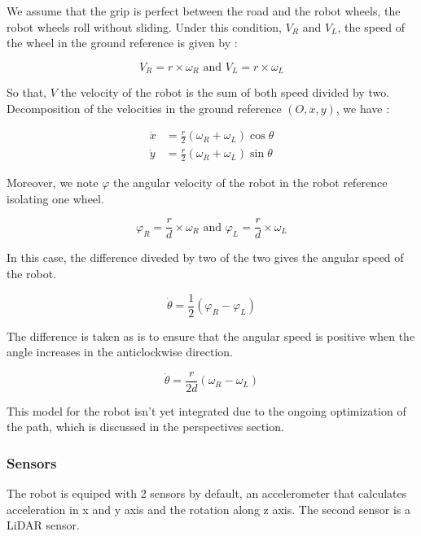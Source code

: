 \documentclass[../main.tex]{subfiles}
\begin{document}
\vspace{0.5em}

We assume that the grip is perfect between the road and the robot wheels, the robot wheels roll without sliding. Under this condition, $V_R$ and $V_L$, the speed of the wheel in the ground reference is given by :

$$\displaystyle V_R = r \times \omega_R \text{     and     } V_L = r \times \omega_L$$

So that, $V$ the velocity of the robot is the sum of both speed divided by two. Decomposition of the velocities in the ground reference $(O, x, y)$, we have :


\begin{align*}
	\displaystyle \dot{x} &= \frac{r}{2} \left(\omega_R + \omega_L\right) \cos \theta\\
	\displaystyle \dot{y} &= \frac{r}{2} \left(\omega_R + \omega_L\right) \sin \theta
\end{align*}


Moreover, we note $\varphi$ the angular velocity of the robot in the robot reference isolating one wheel.


$$\displaystyle \varphi_R = \frac{r}{d} \times \omega_R \text{     and     } \varphi_L =  \frac{r}{d} \times \omega_L$$

In this case, the difference diveded by two of the two gives the angular speed of the robot.

$$\displaystyle \dot{\theta} = \frac{1}{2} \left(\varphi_R - \varphi_L\right)$$

The difference is taken as is to ensure that the angular speed is positive when the angle increases in the anticlockwise direction.

$$\displaystyle \dot{\theta} = \frac{r}{2d} \left(\omega_R - \omega_L\right)$$

This model for the robot isn't yet integrated due to the ongoing optimization of the path, which is discussed in the perspectives section.


\subsubsection{Sensors}

The robot is equiped with 2 sensors by default, an accelerometer that calculates acceleration in x and y axis and the rotation along z axis. The second sensor is a LiDAR sensor.

\vspace{1em}
\end{document}
